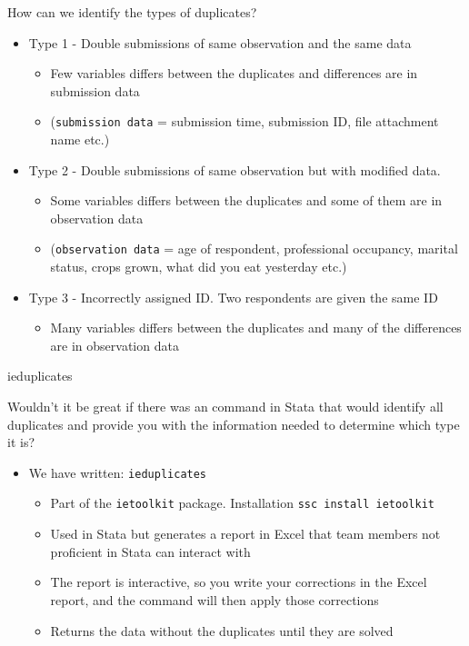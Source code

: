 \documentclass[aspectratio=169]{beamer}
\begin{document}
\begin{frame}{How can we identify the types of duplicates?}
	\begin{itemize}
		\item Type 1 - Double submissions of same observation and the same data
		\begin{itemize}
			\item Few variables differs between the duplicates and differences are in submission data
			\item (\texttt{submission data} = submission time, submission ID, file attachment name etc.)
		\end{itemize}
		\item Type 2 - Double submissions of same observation but with modified data.
		\begin{itemize}
			\item Some variables differs between the duplicates and some of them are in observation data
			\item (\texttt{observation data} = age of respondent, professional occupancy, marital status, crops grown, what did you eat yesterday etc.)
		\end{itemize}
		\item Type 3 - Incorrectly assigned ID. Two respondents are given the same ID
		\begin{itemize}
			\item Many variables differs between the duplicates and many of the differences are in observation data
		\end{itemize}
	\end{itemize}
\end{frame}

\begin{frame}{ieduplicates}
	
	Wouldn't it be great if there was an command in Stata that would identify all duplicates and provide you with the information needed to determine which type it is?

	\begin{itemize}
		\item We have written: \texttt{ieduplicates}
		\begin{itemize}
			\item Part of the \texttt{ietoolkit} package. Installation \texttt{ssc install ietoolkit}
			\item Used in Stata but generates a report in Excel that team members not proficient in Stata can interact with
			\item The report is interactive, so you write your corrections in the Excel report, and the command will then apply those corrections
			\item Returns the data without the duplicates until they are solved
		\end{itemize}
	\end{itemize}
\end{frame}
\end{document}
